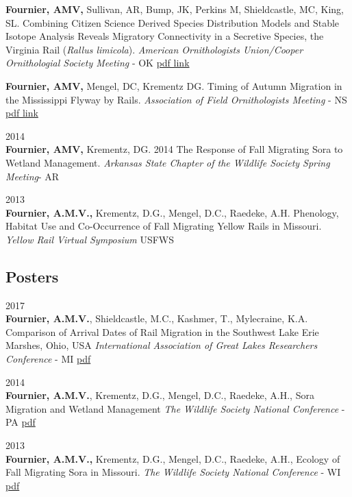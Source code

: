 \documentclass[]{article}
\begin{document}
\textbf{Fournier, AMV,} Sullivan, AR, Bump, JK, Perkins M, Shieldcastle,
MC, King, SL. Combining Citizen Science Derived Species Distribution
Models and Stable Isotope Analysis Reveals Migratory Connectivity in a
Secretive Species, the Virginia Rail (\emph{Rallus limicola}).
\emph{American Ornithologists Union/Cooper Ornithologial Society
Meeting} - OK \href{http://doi.org/5m5}{pdf link}

\textbf{Fournier, AMV,} Mengel, DC, Krementz DG. Timing of Autumn
Migration in the Mississippi Flyway by Rails. \emph{Association of Field
Ornithologists Meeting} - NS \href{http://doi.org/5ks}{pdf link}

2014\\
\textbf{Fournier, AMV,} Krementz, DG. 2014 The Response of Fall
Migrating Sora to Wetland Management. \emph{Arkansas State Chapter of
the Wildlife Society Spring Meeting}- AR

2013\\
\textbf{Fournier, A.M.V.,} Krementz, D.G., Mengel, D.C., Raedeke, A.H.
Phenology, Habitat Use and Co-Occurrence of Fall Migrating Yellow Rails
in Missouri. \emph{Yellow Rail Virtual Symposium} USFWS

\subsection{Posters}\label{posters}

2017\\
\textbf{Fournier, A.M.V.}, Shieldcastle, M.C., Kashmer, T., Mylecraine,
K.A. Comparison of Arrival Dates of Rail Migration in the Southwest Lake
Erie Marshes, Ohio, USA \emph{International Association of Great Lakes
Researchers Conference} - MI
\href{https://figshare.com/articles/Comparison_of_Arrival_Dates_of_Rail_Migration_in_the_Southwest_Lake_Erie_Marshes/4726315}{pdf}

2014\\
\textbf{Fournier, A.M.V.}, Krementz, D.G., Mengel, D.C., Raedeke, A.H.,
Sora Migration and Wetland Management \emph{The Wildlife Society
National Conference} - PA
\href{http://figshare.com/articles/Sora_migration_and_Wetland_Management/1226634}{pdf}

2013\\
\textbf{Fournier, A.M.V.,} Krementz, D.G., Mengel, D.C., Raedeke, A.H.,
Ecology of Fall Migrating Sora in Missouri. \emph{The Wildlife Society
National Conference} - WI
\href{http://figshare.com/articles/The_Ecology_of_Fall_Migrating_Sora_in_Missouri/840571}{pdf}
\end{document}
